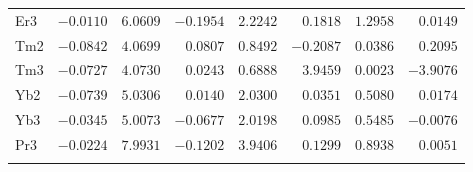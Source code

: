 \begin{table}[H]
{\begin{tabular}{lrrrrrrr}
Er3 &$-0.0110$ &$6.0609$ &$-0.1954$ &$2.2242$ &$0.1818$ &$1.2958$ &$0.0149$ \\
Tm2 &$-0.0842$ &$4.0699$ &$0.0807$ &$0.8492$ &$-0.2087$ &$0.0386$ &$0.2095$ \\
Tm3 &$-0.0727$ &$4.0730$ &$0.0243$ &$0.6888$ &$3.9459$ &$0.0023$ &$-3.9076$ \\
Yb2 &$-0.0739$ &$5.0306$ &$0.0140$ &$2.0300$ &$0.0351$ &$0.5080$ &$0.0174$ \\
Yb3 &$-0.0345$ &$5.0073$ &$-0.0677$ &$2.0198$ &$0.0985$ &$0.5485$ &$-0.0076$ \\
Pr3 &$-0.0224$ &$7.9931$ &$-0.1202$ &$3.9406$ &$0.1299$ &$0.8938$ &$0.0051$ \\
\hline\\[-2ex]
\end{tabular}
}
\end{table}
